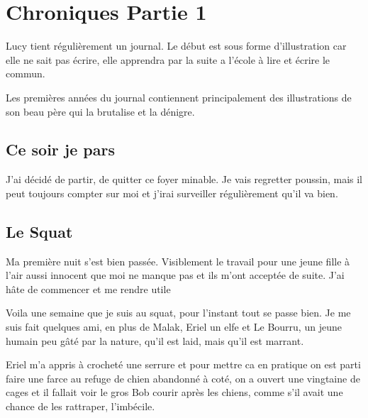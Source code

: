 \documentclass[10pt,a4paper,twoside,twocolumn,openany]{book}
\begin{document}
\vspace{2cm}

\chapter{Chroniques Partie 1}


\begin{quotebox}
Lucy tient régulièrement un journal. Le début est sous forme d'illustration car elle ne sait pas écrire, elle 
apprendra par la suite a l'école à lire et écrire le commun.

Les premières années du journal contiennent principalement des illustrations de son beau père qui la brutalise
et la dénigre.
\end{quotebox}

\section{Ce soir je pars}

J'ai décidé de partir, de quitter ce foyer minable. Je vais regretter poussin, mais 
il peut toujours compter sur moi et j'irai surveiller régulièrement qu'il va bien.

\section{Le Squat}

Ma première nuit s'est bien passée. Visiblement le travail pour une jeune fille
à l'air aussi innocent que moi ne manque pas et ils m'ont acceptée de suite. J'ai
hâte de commencer et me rendre utile

Voila une semaine que je suis au squat, pour l'instant tout se passe bien. Je me 
suis fait quelques ami, en plus de Malak, Eriel un elfe et Le Bourru, un jeune 
humain peu gâté par la nature, qu'il est laid, mais qu'il est marrant.

Eriel m'a appris à crocheté une serrure et pour mettre ca en pratique on est parti
faire une farce au refuge de chien abandonné à coté, on a ouvert une vingtaine
de cages et il fallait voir le gros Bob courir après les chiens, comme s'il avait une chance de
les rattraper, l'imbécile.
\end{document}
